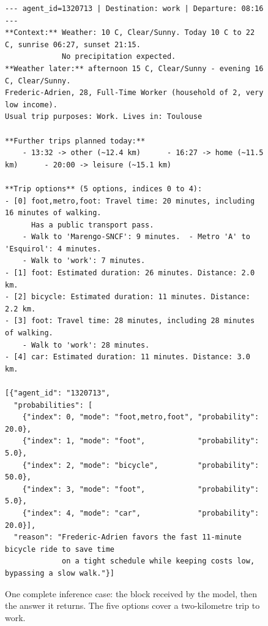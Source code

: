 \begin{figure}[tp]
  \footnotesize
\begin{verbatim}
--- agent_id=1320713 | Destination: work | Departure: 08:16 ---
**Context:** Weather: 10 C, Clear/Sunny. Today 10 C to 22 C, sunrise 06:27, sunset 21:15.
             No precipitation expected.
**Weather later:** afternoon 15 C, Clear/Sunny - evening 16 C, Clear/Sunny.
Frederic-Adrien, 28, Full-Time Worker (household of 2, very low income).
Usual trip purposes: Work. Lives in: Toulouse

**Further trips planned today:**
    - 13:32 -> other (~12.4 km)      - 16:27 -> home (~11.5 km)      - 20:00 -> leisure (~15.1 km)

**Trip options** (5 options, indices 0 to 4):
- [0] foot,metro,foot: Travel time: 20 minutes, including 16 minutes of walking.
      Has a public transport pass.
    - Walk to 'Marengo-SNCF': 9 minutes.  - Metro 'A' to 'Esquirol': 4 minutes.
    - Walk to 'work': 7 minutes.
- [1] foot: Estimated duration: 26 minutes. Distance: 2.0 km.
- [2] bicycle: Estimated duration: 11 minutes. Distance: 2.2 km.
- [3] foot: Travel time: 28 minutes, including 28 minutes of walking.
    - Walk to 'work': 28 minutes.
- [4] car: Estimated duration: 11 minutes. Distance: 3.0 km.

[{"agent_id": "1320713",
  "probabilities": [
    {"index": 0, "mode": "foot,metro,foot", "probability": 20.0},
    {"index": 1, "mode": "foot",            "probability":  5.0},
    {"index": 2, "mode": "bicycle",         "probability": 50.0},
    {"index": 3, "mode": "foot",            "probability":  5.0},
    {"index": 4, "mode": "car",             "probability": 20.0}],
  "reason": "Frederic-Adrien favors the fast 11-minute bicycle ride to save time
             on a tight schedule while keeping costs low, bypassing a slow walk."}]
\end{verbatim}
  \caption{One complete inference case: the block received by the model, then the answer it returns. The five options cover a two-kilometre trip to work.}
  \label{fig:inference-case}
\end{figure}

